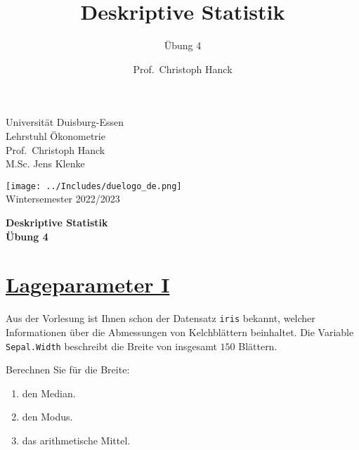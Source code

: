 \documentclass[12pt,a4paper]{article}
\title{Deskriptive Statistik}
\subtitle{Übung 4}
\author{Prof.~Christoph Hanck}
\date{}
\newcommand{\tmpsection}[1]{}
\let\tmpsection=\section
\renewcommand{\section}[1]{\tmpsection{\underline{#1}} }
\begin{document}





\restoregeometry



\begin{minipage}{0.6\textwidth}
Universität Duisburg-Essen\\
Lehrstuhl Ökonometrie\\
Prof.~Christoph Hanck \\
M.Sc. Jens Klenke \\
\end{minipage}

	\begin{flushright}
	\vspace{-3.55cm}
	\texttt{[image: ../Includes/duelogo\_de.png]}\\
	\vspace{.125cm}
	Wintersemester 2022/2023
	\end{flushright}


\begin{center}
	\vspace{.25cm}
	\textbf{\Large{Deskriptive Statistik}}\\
	\vspace{.25cm}
	\textbf{\large{Übung 4}}\\
	\vspace{.125cm}
\end{center}





\hypertarget{lageparameter-i}{%
\section{Lageparameter I}\label{lageparameter-i}}

Aus der Vorlesung ist Ihnen schon der Datensatz \texttt{iris} bekannt,
welcher Informationen über die Abmessungen von Kelchblättern beinhaltet.
Die Variable \texttt{Sepal.Width} beschreibt die Breite von insgesamt
\(150\) Blättern.

Berechnen Sie für die Breite:

\begin{enumerate}[label=(\alph*)]
  \item den Median. 
  \item den Modus. 
  \item das arithmetische Mittel. 
\end{enumerate}
\end{document}
